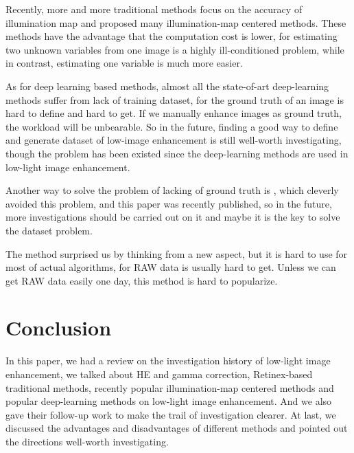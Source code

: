 \documentclass[10pt,twocolumn,letterpaper]{article}
\begin{document}
Recently, more and more traditional methods focus on the accuracy of illumination map and proposed many illumination-map centered methods. These methods have the advantage that the computation cost is lower, for estimating two unknown variables from one image is a highly ill-conditioned problem, while in contrast, estimating one variable is much more easier.

As for deep learning based methods, almost all the state-of-art deep-learning methods suffer from lack of training dataset, for the ground truth of an image is hard to define and hard to get. If we manually enhance images as ground truth, the workload will be unbearable. So in the future, finding a good way to define and generate dataset of low-image enhancement is still well-worth investigating, though the problem has been existed since the deep-learning methods are used in low-light image enhancement.

Another way to solve the problem of lacking of ground truth is \cite{zhang2019kindling}, which cleverly avoided this problem, and this paper was recently published, so in the future, more investigations should be carried out on it and maybe it is the key to solve the dataset problem.

The method \cite{chen2018learning} surprised us by thinking from a new aspect, but it is hard to use for most of actual algorithms, for RAW data is usually hard to get. Unless we can get RAW data easily one day, this method is hard to popularize.
\section{Conclusion}
In this paper, we had a review on the investigation history of low-light image enhancement, we talked about HE and gamma correction, Retinex-based traditional methods, recently popular illumination-map centered methods and popular deep-learning methods on low-light image enhancement. And we also gave their follow-up work to make the trail of investigation clearer. At last, we discussed the advantages and disadvantages of different methods and pointed out the directions well-worth investigating.

{\small


}
\end{document}
